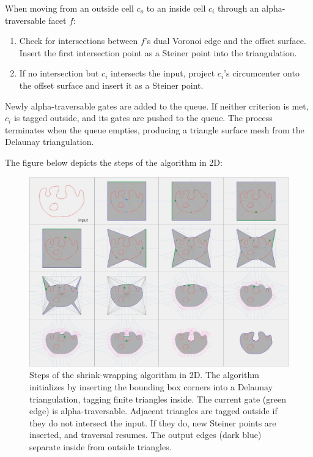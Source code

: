 \documentclass[12pt]{article}
\begin{document}
When moving from an outside cell \( c_o \) to an inside cell \( c_i \) through
an alpha-traversable facet \( f \):

\begin{enumerate}
    \item Check for intersections between \( f \)'s dual Voronoi edge and
    the offset surface. Insert the first intersection point as a Steiner point
    into the triangulation.
    \item If no intersection but \( c_i \) intersects the input, project
    \( c_i \)'s circumcenter onto the offset surface and insert it as a Steiner point.
\end{enumerate}

Newly alpha-traversable gates are added to the queue. If neither criterion is
met, \( c_i \) is tagged outside, and its gates are pushed to the queue. The
process terminates when the queue empties, producing a triangle surface mesh from
 the Delaunay triangulation.

The figure below depicts the steps of the algorithm in 2D:
\begin{figure}[H]
    \centering
        \centering
        \includegraphics[width=\textwidth]{images/alpha-wrapping-steps.jpg}
        \caption{Steps of the shrink-wrapping algorithm in 2D. The algorithm
        initializes by inserting the bounding box corners into a Delaunay
        triangulation, tagging finite triangles inside. The current gate (green
        edge) is alpha-traversable. Adjacent triangles are tagged outside if
        they do not intersect the input. If they do, new Steiner points are
        inserted, and traversal resumes. The output edges (dark blue) separate
        inside from outside triangles.
        }
\end{figure}
\end{document}
